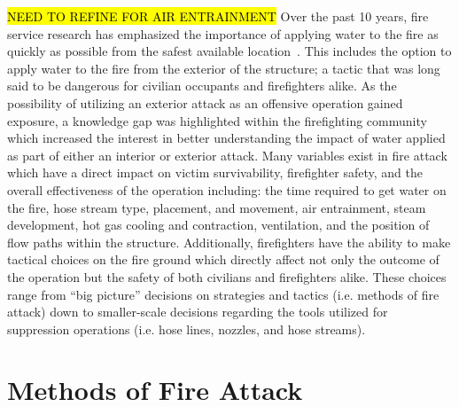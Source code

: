 \documentclass[12pt,oneside]{book}
\begin{document}
\hl{NEED TO REFINE FOR AIR ENTRAINMENT}
Over the past 10 years, fire service research has emphasized the importance of applying water to the fire as quickly as possible from the safest available location~\cite{DHS2008,DHS2010}. This includes the option to apply water to the fire from the exterior of the structure; a tactic that was long said to be dangerous for civilian occupants and firefighters alike. As the possibility of utilizing an exterior attack as an offensive operation gained exposure, a knowledge gap was highlighted within the firefighting community which increased the interest in better understanding the impact of water applied as part of either an interior or exterior attack. Many variables exist in fire attack which have a direct impact on victim survivability, firefighter safety, and the overall effectiveness of the operation including: the time required to get water on the fire, hose stream type, placement, and movement, air entrainment, steam development, hot gas cooling and contraction, ventilation, and the position of flow paths within the structure. Additionally, firefighters have the ability to make tactical choices on the fire ground which directly affect not only the outcome of the operation but the safety of both civilians and firefighters alike. These choices range from ``big picture'' decisions on strategies and tactics (i.e. methods of fire attack) down to smaller-scale decisions regarding the tools utilized for suppression operations (i.e. hose lines, nozzles, and hose streams). 

\section*{Methods of Fire Attack}
\end{document}
